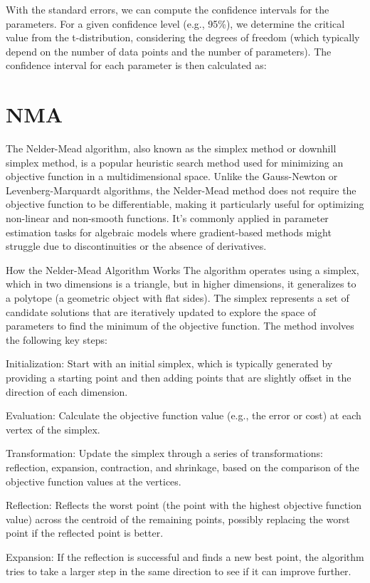 \documentclass[17pt]{extarticle} %
\begin{document}
With the standard errors, we can compute the confidence intervals for the parameters. For a given confidence level (e.g., 95\%), we determine the critical value from the t-distribution, considering the degrees of freedom (which typically depend on the number of data points and the number of parameters).
The confidence interval for each parameter is then calculated as: 
\section*{NMA}

The Nelder-Mead algorithm, also known as the simplex method or downhill simplex method, is a popular heuristic search method used for minimizing an objective function in a multidimensional space. Unlike the Gauss-Newton or Levenberg-Marquardt algorithms, the Nelder-Mead method does not require the objective function to be differentiable, making it particularly useful for optimizing non-linear and non-smooth functions. It's commonly applied in parameter estimation tasks for algebraic models where gradient-based methods might struggle due to discontinuities or the absence of derivatives.

How the Nelder-Mead Algorithm Works
The algorithm operates using a simplex, which in two dimensions is a triangle, but in higher dimensions, it generalizes to a polytope (a geometric object with flat sides). The simplex represents a set of candidate solutions that are iteratively updated to explore the space of parameters to find the minimum of the objective function. The method involves the following key steps:

Initialization: Start with an initial simplex, which is typically generated by providing a starting point and then adding points that are slightly offset in the direction of each dimension.

Evaluation: Calculate the objective function value (e.g., the error or cost) at each vertex of the simplex.

Transformation: Update the simplex through a series of transformations: reflection, expansion, contraction, and shrinkage, based on the comparison of the objective function values at the vertices.

Reflection: Reflects the worst point (the point with the highest objective function value) across the centroid of the remaining points, possibly replacing the worst point if the reflected point is better.

Expansion: If the reflection is successful and finds a new best point, the algorithm tries to take a larger step in the same direction to see if it can improve further.
\end{document}
